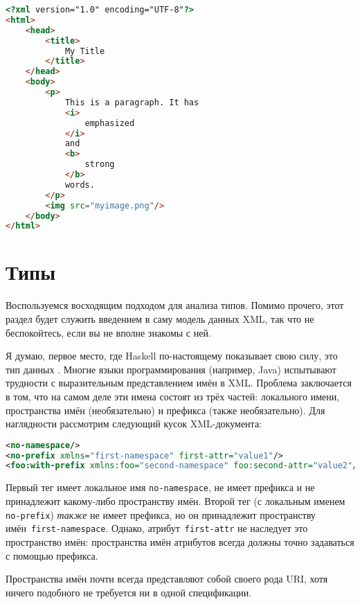 
\begin{lstlisting}[language=HTML, caption={Выходные данные в формате XHTML}]
<?xml version="1.0" encoding="UTF-8"?>
<html>
    <head>
        <title>
            My Title
        </title>
    </head>
    <body>
        <p>
            This is a paragraph. It has
            <i>
                emphasized
            </i>
            and
            <b>
                strong
            </b>
            words.
        </p>
        <img src="myimage.png"/>
    </body>
</html>
\end{lstlisting}

\section{Типы} %

Воспользуемся восходящим подходом для анализа типов. Помимо прочего, этот раздел будет служить введением в саму модель данных XML, так что не беспокойтесь, если вы не вполне знакомы с ней.

Я думаю, первое место, где Haskell по-настоящему показывает свою силу, это тип данных . Многие языки программирования (например, Java) испытывают трудности с выразительным представлением имён в XML. Проблема заключается в том, что на самом деле эти имена состоят из трёх частей: локального имени, пространства имён (необязательно) и префикса (также необязательно). Для наглядности рассмотрим следующий кусок XML-документа:
\begin{lstlisting}[language=XML]
<no-namespace/>
<no-prefix xmlns="first-namespace" first-attr="value1"/>
<foo:with-prefix xmlns:foo="second-namespace" foo:second-attr="value2"/>
\end{lstlisting}

Первый тег имеет локальное имя \lstinline!no-namespace!, не имеет префикса и не принадлежит какому-либо пространству имён. Второй тег (с локальным именем \lstinline!no-prefix!) \emph{также} не имеет префикса, но он принадлежит пространству имён~\lstinline!first-namespace!. Однако, атрибут~\lstinline!first-attr! не наследует это пространство имён: пространства имён атрибутов всегда должны точно задаваться с помощью префикса.

\begin{remark}
Пространства имён почти всегда представляют собой своего рода URI, хотя ничего подобного не требуется ни в одной спецификации.
\end{remark}

